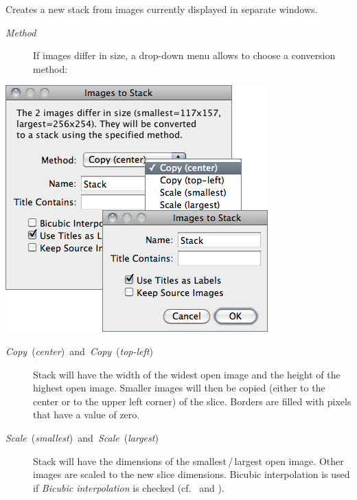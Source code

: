 Creates a new stack from images currently displayed in separate windows.
\begin{description}
\item [{\emph{Method}}] If images differ in size, a drop-down menu allows
to choose a conversion method:
\end{description}
\begin{minipage}[c][1\totalheight][t]{0.52\columnwidth}%
\includegraphics[scale=0.55]{images/ImageToStacks}%
\end{minipage}%
\begin{minipage}[c][1\totalheight][t]{0.48\columnwidth}%
\begin{description}
\item [{\emph{Copy}\ (\emph{center})\emph{\ }and\emph{\ Copy}\ (\emph{top-left})}] Stack
will have the width of the widest open image and the height of the
highest open image. Smaller images will then be copied (either to
the center or to the upper left corner) of the slice. Borders are
filled with pixels that have a value of zero.
\item [{\emph{Scale}\ (\emph{smallest})\emph{\ }and\emph{\ Scale}\ (\emph{largest})}] Stack
will have the dimensions of the smallest\,/\,largest open image.
Other images are scaled to the new slice dimensions. Bicubic interpolation
is used if \emph{Bicubic interpolation} is checked (cf.\ 
and ).\end{description}
%
\end{minipage}
